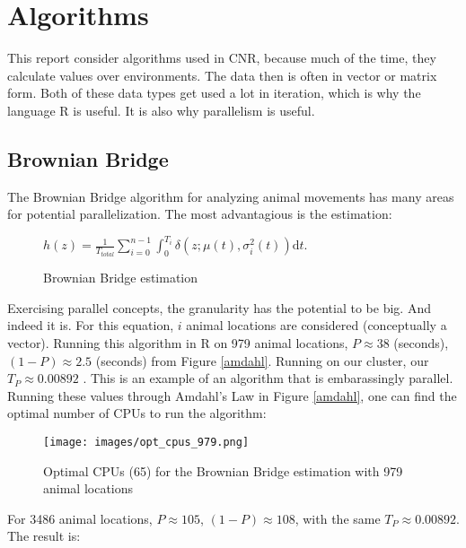 
\section{Algorithms}
This report consider algorithms used in CNR, because much of the time, they calculate values over 
environments. The data then is often in vector or matrix form. Both of these data types get used a lot in 
iteration, which is why the language R is useful. It is also why parallelism is useful.

\subsection{Brownian Bridge}
The Brownian Bridge algorithm for analyzing animal movements has many areas for potential parallelization.
The most advantagious is the estimation:

\begin{figure}[h!]
        \begin{center}
                $h(z) = \frac{1}{T_{total}} \sum_{i=0}^{n-1} \int_0^{T_i} \! \delta(z; \mu(t),\sigma_i^2(t)) \mathrm{d}t.$
                \caption{Brownian Bridge estimation \cite{bb}}
                \label{bb_est}
        \end{center}
\end{figure}

Exercising parallel concepts, the granularity has the potential to be big. And indeed it is. For this equation,
$i$ animal locations are considered (conceptually a vector). Running this algorithm in R on 979 animal locations,
 $P \approx 38 $ (seconds), $(1 - P) \approx 2.5 $ (seconds) from Figure \ref{amdahl}. Running on our cluster, 
our $T_P \approx 0.00892$ . This is an example of an algorithm that is embarassingly parallel. Running these
values through Amdahl's Law in Figure \ref{amdahl}, one can find the optimal number of CPUs to run 
the algorithm:

\begin{figure}[h!]
        \begin{center}
                \texttt{[image: images/opt\_cpus\_979.png]}
                \caption{Optimal CPUs (65) for the Brownian Bridge estimation with 979 animal locations}
                \label{opt_cpus_979}
        \end{center}
\end{figure}

\pagebreak

For 3486 animal locations, $P \approx 105$, $(1 - P) \approx 108$, with the same $T_P \approx 0.00892$.
The result is:

